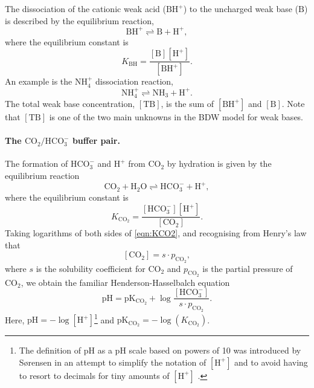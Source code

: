 \documentclass[fleqn,10pt]{physiome}
\begin{document}
The dissociation of the cationic weak acid ($\mathrm{BH^+}$) to the uncharged weak base ($\mathrm{B}$) is described by the equilibrium reaction,
\begin{equation}
\mathrm{BH^+ \rightleftharpoons B + H^+},
\end{equation}
where the equilibrium constant is
\begin{equation}
K_\mathrm{BH}=\dfrac{\mathrm{[B][H^+]}}{\mathrm{[BH^+]}}.
\end{equation}
An example is the $\mathrm{NH_4^+}$ dissociation reaction,
\begin{equation*}
\mathrm{NH_4^+ \rightleftharpoons NH_3 + H^+}.
\end{equation*}
The total weak base concentration, $\mathrm{[TB]}$, is the sum of $\mathrm{[BH^+]}$ and $\mathrm{[B]}$. Note that $\mathrm{[TB]}$ is one of the two main unknowns in the BDW model for weak bases.

\paragraph{The $\mathrm{CO_2}/\mathrm{HCO_3^-}$ buffer pair.}

The formation of $\mathrm{HCO_3^-}$ and $\mathrm{H^+}$ from $\mathrm{CO_2}$ by hydration is given by the equilibrium reaction
\begin{equation*}
\mathrm{CO_2 + H_2O \rightleftharpoons HCO_3^- + H^+},
\end{equation*}
where the equilibrium constant is
\begin{equation}
K_\mathrm{CO_2}=\dfrac{\mathrm{[HCO_3^-][H^+]}}{\mathrm{[CO_2]}}.
\label{eqn:KCO2}
\end{equation}
Taking logarithms of both sides of \autoref{eqn:KCO2}, and recognising from Henry's law that
\begin{equation}
\mathrm{[CO_2]}=s\cdot p_\mathrm{CO_2},
\end{equation}
where $s$ is the solubility coefficient for $\mathrm{CO_2}$ and $p_\mathrm{CO_2}$ is the partial pressure of $\mathrm{CO_2}$, we obtain the familiar Henderson-Hasselbalch equation
\begin{equation}
\mathrm{pH}=\mathrm{pK_{CO_2}}+\log{\dfrac{\mathrm{[HCO_3^-]}}{s\cdot p_\mathrm{CO_2}}}.
\end{equation}
Here, $\mathrm{pH}=-\log[\mathrm{H^+}]$\footnote{The definition of $\mathrm{pH}$ as a $\mathrm{pH}$ scale based on powers of 10 was introduced by S{\o}rensen in an attempt to simplify the notation of $\mathrm{[H^+]}$ and to avoid having to resort to decimals for tiny amounts of $\mathrm{[H^+]}$ \citep{sorensen2007messung}.} and $\mathrm{pK_{CO_2}}=-\log(K_\mathrm{CO_2})$.
\end{document}
